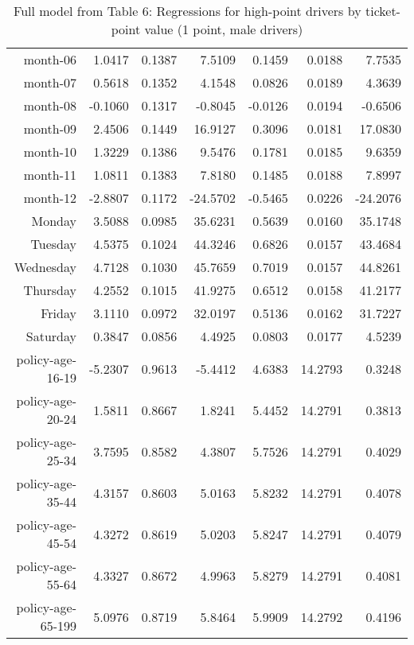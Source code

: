 \documentclass[10pt]{article}
\begin{document}
\begin{table}[ht]
\begin{tabular}{rrrrrrr}
  month-06 & 1.0417 & 0.1387 & 7.5109 & 0.1459 & 0.0188 & 7.7535 \\ 
  month-07 & 0.5618 & 0.1352 & 4.1548 & 0.0826 & 0.0189 & 4.3639 \\ 
  month-08 & -0.1060 & 0.1317 & -0.8045 & -0.0126 & 0.0194 & -0.6506 \\ 
  month-09 & 2.4506 & 0.1449 & 16.9127 & 0.3096 & 0.0181 & 17.0830 \\ 
  month-10 & 1.3229 & 0.1386 & 9.5476 & 0.1781 & 0.0185 & 9.6359 \\ 
  month-11 & 1.0811 & 0.1383 & 7.8180 & 0.1485 & 0.0188 & 7.8997 \\ 
  month-12 & -2.8807 & 0.1172 & -24.5702 & -0.5465 & 0.0226 & -24.2076 \\ 
  Monday & 3.5088 & 0.0985 & 35.6231 & 0.5639 & 0.0160 & 35.1748 \\ 
  Tuesday & 4.5375 & 0.1024 & 44.3246 & 0.6826 & 0.0157 & 43.4684 \\ 
  Wednesday & 4.7128 & 0.1030 & 45.7659 & 0.7019 & 0.0157 & 44.8261 \\ 
  Thursday & 4.2552 & 0.1015 & 41.9275 & 0.6512 & 0.0158 & 41.2177 \\ 
  Friday & 3.1110 & 0.0972 & 32.0197 & 0.5136 & 0.0162 & 31.7227 \\ 
  Saturday & 0.3847 & 0.0856 & 4.4925 & 0.0803 & 0.0177 & 4.5239 \\ 
  policy-age-16-19 & -5.2307 & 0.9613 & -5.4412 & 4.6383 & 14.2793 & 0.3248 \\ 
  policy-age-20-24 & 1.5811 & 0.8667 & 1.8241 & 5.4452 & 14.2791 & 0.3813 \\ 
  policy-age-25-34 & 3.7595 & 0.8582 & 4.3807 & 5.7526 & 14.2791 & 0.4029 \\ 
  policy-age-35-44 & 4.3157 & 0.8603 & 5.0163 & 5.8232 & 14.2791 & 0.4078 \\ 
  policy-age-45-54 & 4.3272 & 0.8619 & 5.0203 & 5.8247 & 14.2791 & 0.4079 \\ 
  policy-age-55-64 & 4.3327 & 0.8672 & 4.9963 & 5.8279 & 14.2791 & 0.4081 \\ 
  policy-age-65-199 & 5.0976 & 0.8719 & 5.8464 & 5.9909 & 14.2792 & 0.4196 \\ 
   \hline
\end{tabular}
\caption{Full model from Table 6: Regressions for high-point drivers by ticket-point value (1 point, male drivers)} 
\label{tab_6_1_pts_M}
\end{table}


\clearpage
\pagebreak
\end{document}
